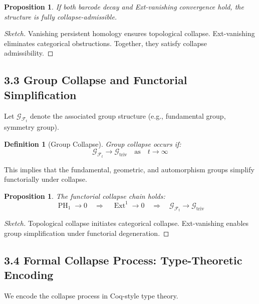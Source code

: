 \documentclass[11pt]{article}
\newtheorem{definition}[theorem]{Definition}
\newtheorem{proposition}[theorem]{Proposition}
\DeclareMathOperator{\Ext}{Ext}
\DeclareMathOperator{\PH}{PH}
\begin{document}
\begin{proposition}
If both barcode decay and Ext-vanishing convergence hold, the structure is fully collapse-admissible.
\end{proposition}

\begin{proof}[Sketch]
Vanishing persistent homology ensures topological collapse. Ext-vanishing eliminates categorical obstructions. Together, they satisfy collapse admissibility.
\end{proof}

\subsection{3.3 Group Collapse and Functorial Simplification}

Let $\mathcal{G}_{\mathcal{F}_t}$ denote the associated group structure (e.g., fundamental group, symmetry group).

\begin{definition}[Group Collapse]
Group collapse occurs if:
\begin{equation}
\mathcal{G}_{\mathcal{F}_t} \longrightarrow \mathcal{G}_{\mathrm{triv}} \quad \text{as} \quad t \to \infty
\end{equation}
\end{definition}

This implies that the fundamental, geometric, and automorphism groups simplify functorially under collapse.

\begin{proposition}
The functorial collapse chain holds:
\begin{equation}
\PH_1 \to 0 \quad \Longrightarrow \quad \Ext^1 \to 0 \quad \Longrightarrow \quad \mathcal{G}_{\mathcal{F}_t} \to \mathcal{G}_{\mathrm{triv}}
\end{equation}
\end{proposition}

\begin{proof}[Sketch]
Topological collapse initiates categorical collapse. Ext-vanishing enables group simplification under functorial degeneration.
\end{proof}

\subsection{3.4 Formal Collapse Process: Type-Theoretic Encoding}

We encode the collapse process in Coq-style type theory.
\end{document}
